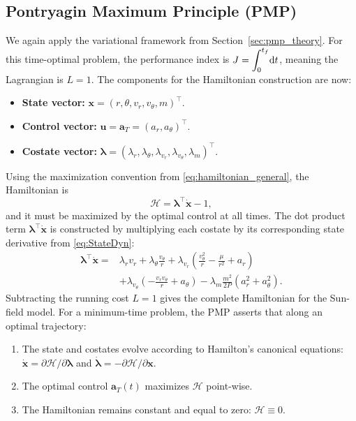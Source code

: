 \documentclass[journal,a4paper]{IEEEtran}
\begin{document}
\subsection{Pontryagin Maximum Principle (PMP)}
We again apply the variational framework from Section~\ref{sec:pmp_theory}. For this time-optimal problem, the performance index is $J=\displaystyle\int_{0}^{t_f}\!{\rm d}t$, meaning the Lagrangian is $L=1$. The components for the Hamiltonian construction are now:
\begin{itemize}
    \item \textbf{State vector:} $\mathbf{x} = (r, \theta, v_r, v_\theta, m)^\top$.
    \item \textbf{Control vector:} $\mathbf{u} = \mathbf{a}_T = (a_r, a_\theta)^\top$.
    \item \textbf{Costate vector:} $\boldsymbol{\lambda} = (\lambda_r, \lambda_\theta, \lambda_{v_r}, \lambda_{v_\theta}, \lambda_m)^\top$.
\end{itemize}
\medskip
Using the maximization convention from \eqref{eq:hamiltonian_general}, the Hamiltonian is
\[
    \mathcal{H}
    =
    \boldsymbol{\lambda}^\top \dot{\mathbf{x}} - 1,
\]
and it must be maximized by the optimal control at all times. The dot product term $\boldsymbol{\lambda}^\top \dot{\mathbf{x}}$ is constructed by multiplying each costate by its corresponding state derivative from \eqref{eq:StateDyn}:
\begin{align}
\boldsymbol{\lambda}^\top \dot{\mathbf{x}} = {} & \lambda_r v_r + \lambda_\theta\frac{v_\theta}{r} + \lambda_{v_r}\left(\frac{v_\theta^2}{r} - \frac{\mu}{r^2} + a_r\right) \nonumber\\
& + \lambda_{v_\theta}\left(-\frac{v_r v_\theta}{r} + a_\theta\right) - \lambda_m\frac{m^2}{2P}(a_r^2+a_\theta^2).
\end{align}
Subtracting the running cost \(L=1\) gives the complete Hamiltonian for the Sun-field model. For a minimum-time problem, the PMP asserts that along an optimal trajectory:
\begin{enumerate}
    \item The state and costates evolve according to Hamilton's
          canonical equations: $\dot{\mathbf{x}} = \partial\mathcal{H}/\partial\boldsymbol{\lambda}$
          and $\dot{\boldsymbol{\lambda}} = -\partial\mathcal{H}/\partial\mathbf{x}$.
    \item The optimal control $\mathbf{a}_T(t)$ maximizes $\mathcal{H}$ point-wise.
    \item The Hamiltonian remains constant and equal to zero: $\mathcal H\equiv 0$.
\end{enumerate}
\end{document}

